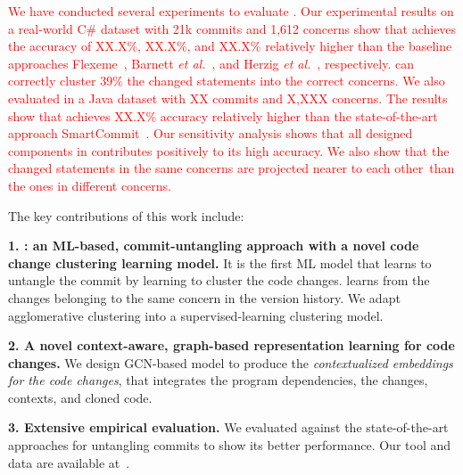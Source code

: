  \textcolor{red}{We have conducted several experiments to evaluate
    {\tool}. Our experimental results on a real-world C\# dataset with
    21k commits and 1,612 concerns show that {\tool} achieves the
    accuracy of XX.X\%, XX.X\%, and XX.X\% relatively higher than the
    baseline approaches Flexeme~\cite{flexeme-fse20}, Barnett
    {\em et al.}~\cite{barnett-icse15}, and Herzig {\em et
      al.}~\cite{kim-emse16}, respectively. {\tool} can correctly
    cluster 39\% the changed statements into the correct
    concerns.
%
  We also evaluated {\tool} in a Java dataset with XX commits and
  X,XXX concerns. The results show that {\tool} achieves XX.X\%
  accuracy relatively higher than the state-of-the-art approach
  SmartCommit~\cite{smartcommit-fse21}. Our sensitivity analysis shows
  that all designed components in {\tool} contributes positively to
  its high accuracy. We also show that the changed statements in the
  same concerns are projected nearer to each other~than the ones in
  different concerns.}

The key contributions of this work include:

{\bf 1. {\tool}: an ML-based, commit-untangling approach with a novel
  code change clustering learning model.} It is the first ML model
that learns to untangle the commit by learning to cluster the code
changes.  {\tool} learns from the changes belonging to the same
concern in the version history. We adapt agglomerative clustering
into a supervised-learning clustering model.

{\bf 2. A novel context-aware, graph-based representation learning for
  code changes.} We design GCN-based model to produce the {\em
  contextualized embeddings for the code changes}, that
integrates the program dependencies, the changes, contexts, and cloned code.

{\bf 3. Extensive empirical evaluation.} We evaluated {\tool} against
the state-of-the-art approaches for untangling commits to show its better
performance. Our tool and data are available at~\cite{utango-website}.

